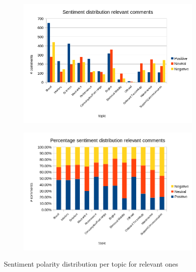 \begin{figure}[ht]
	\centering
	\begin{subfigure}{1\textwidth} %
		\includegraphics[width=1\textwidth]{figures/charts/sentiment-distribution.png}
		\label{fig:sentiment-distribution}
	\end{subfigure}
		\vspace{-1cm} %
	\begin{subfigure}{1\textwidth} %
		\includegraphics[width=1\textwidth]{figures/charts/sentiment-distribution-perc.png}
	\label{fig:sentiment-distribution-perc}
	\end{subfigure}
	\caption{Sentiment polarity distribution per topic for relevant ones} %
	\label{fig:annotations-relevant}
\end{figure}


